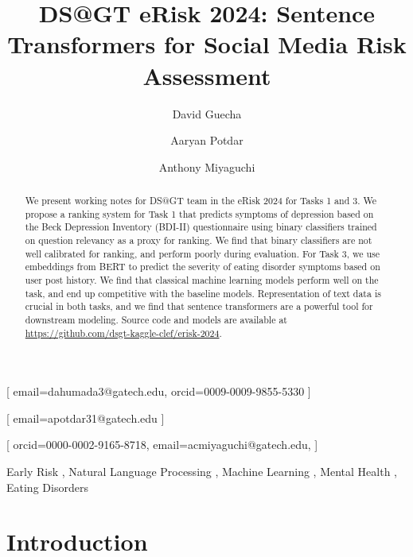 \documentclass[]{style/ceurart}
\begin{document}


\title{
DS@GT eRisk 2024: Sentence Transformers for Social Media Risk Assessment
}

\author[1]{David Guecha}[
email=dahumada3@gatech.edu,
orcid=0009-0009-9855-5330
]
\cormark[1]
\author[1]{Aaryan Potdar}[
email=apotdar31@gatech.edu
]
\author[1]{Anthony Miyaguchi}[
orcid=0000-0002-9165-8718,
email=acmiyaguchi@gatech.edu,
]


\address[1]{Georgia Institute of Technology, North Ave NW, Atlanta, GA 30332}


\begin{abstract}
We present working notes for DS@GT team in the eRisk 2024 for Tasks 1 and 3. 
We propose a ranking system for Task 1 that predicts symptoms of depression based on the Beck Depression Inventory (BDI-II) questionnaire using binary classifiers trained on question relevancy as a proxy for ranking.
We find that binary classifiers are not well calibrated for ranking, and perform poorly during evaluation.
For Task 3, we use embeddings from BERT to predict the severity of eating disorder symptoms based on user post history.
We find that classical machine learning models perform well on the task, and end up competitive with the baseline models.
Representation of text data is crucial in both tasks, and we find that sentence transformers are a powerful tool for downstream modeling.
Source code and models are available at \url{https://github.com/dsgt-kaggle-clef/erisk-2024}.

\end{abstract}

\begin{keywords}
  Early Risk \sep
  Natural Language Processing \sep
  Machine Learning \sep
  Mental Health \sep
  Eating Disorders
\end{keywords}


\maketitle

\section{Introduction}
\end{document}
